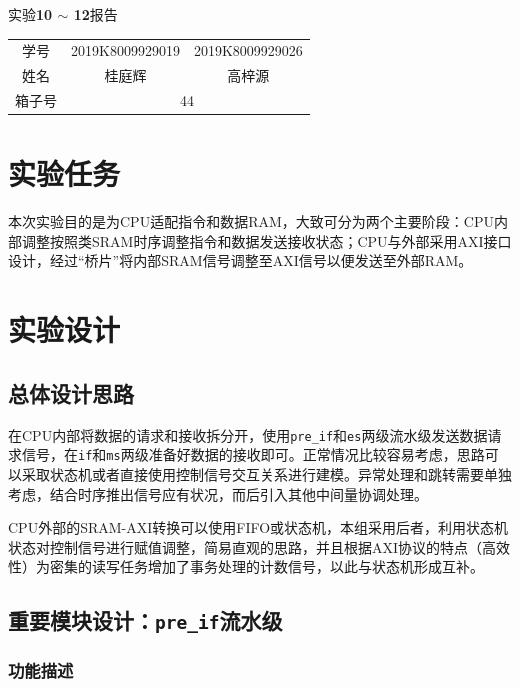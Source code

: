 \documentclass[UTF-8,twoside,c5size]{ctexart}
\begin{document}
	\begin{center}
		\heiti{}
		实验\textbf{10 $ \bm\sim $ 12}报告
	\end{center}

	\begin{table}[!h]
		\raggedleft
		\begin{tabular}{ccc}
			{\heiti 学号} & {2019K8009929019} & {2019K8009929026} \\
			{\heiti 姓名} & 桂庭辉 & 高梓源 \\
			{\heiti 箱子号} & \multicolumn{2}{c}{44}
		\end{tabular}
	\end{table}
	
	\section{实验任务}
	
	本次实验目的是为CPU适配指令和数据RAM，大致可分为两个主要阶段：CPU内部调整按照类SRAM时序调整指令和数据发送接收状态；CPU与外部采用AXI接口设计，经过“桥片”将内部SRAM信号调整至AXI信号以便发送至外部RAM。
	
	\section{实验设计}	
	
	\subsection{总体设计思路}
	
	在CPU内部将数据的请求和接收拆分开，使用\texttt{pre_if}和\texttt{es}两级流水级发送数据请求信号，在\texttt{if}和\texttt{ms}两级准备好数据的接收即可。正常情况比较容易考虑，思路可以采取状态机或者直接使用控制信号交互关系进行建模。异常处理和跳转需要单独考虑，结合时序推出信号应有状况，而后引入其他中间量协调处理。
	
	CPU外部的SRAM-AXI转换可以使用FIFO或状态机，本组采用后者，利用状态机状态对控制信号进行赋值调整，简易直观的思路，并且根据AXI协议的特点（高效性）为密集的读写任务增加了事务处理的计数信号，以此与状态机形成互补。
	
	\subsection{重要模块设计：\texttt{pre_if}流水级}
	
	\subsubsection{功能描述}
	
\end{document}
